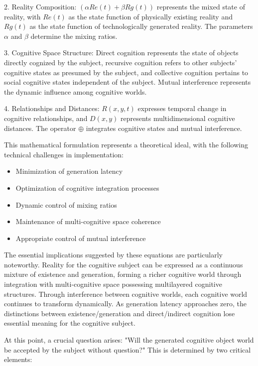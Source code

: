 \documentclass{article}
\begin{document}
2. Reality Composition: $(\alpha Re(t) + \beta Rg(t))$ represents the mixed state of reality, with $Re(t)$ as the state function of physically existing reality and $Rg(t)$ as the state function of technologically generated reality. The parameters $\alpha$ and $\beta$ determine the mixing ratios.

3. Cognitive Space Structure: Direct cognition represents the state of objects directly cognized by the subject, recursive cognition refers to other subjects' cognitive states as presumed by the subject, and collective cognition pertains to social cognitive states independent of the subject. Mutual interference represents the dynamic influence among cognitive worlds.

4. Relationships and Distances: $R(x, y, t)$ expresses temporal change in cognitive relationships, and $D(x, y)$ represents multidimensional cognitive distances. The operator $\oplus$ integrates cognitive states and mutual interference.

This mathematical formulation represents a theoretical ideal, with the following technical challenges in implementation:

\begin{itemize}
    \item Minimization of generation latency
    \item Optimization of cognitive integration processes
    \item Dynamic control of mixing ratios
    \item Maintenance of multi-cognitive space coherence
    \item Appropriate control of mutual interference
\end{itemize}

The essential implications suggested by these equations are particularly noteworthy. Reality for the cognitive subject can be expressed as a continuous mixture of existence and generation, forming a richer cognitive world through integration with multi-cognitive space possessing multilayered cognitive structures. Through interference between cognitive worlds, each cognitive world continues to transform dynamically. As generation latency approaches zero, the distinctions between existence/generation and direct/indirect cognition lose essential meaning for the cognitive subject.

At this point, a crucial question arises: "Will the generated cognitive object world be accepted by the subject without question?" This is determined by two critical elements:
\end{document}
